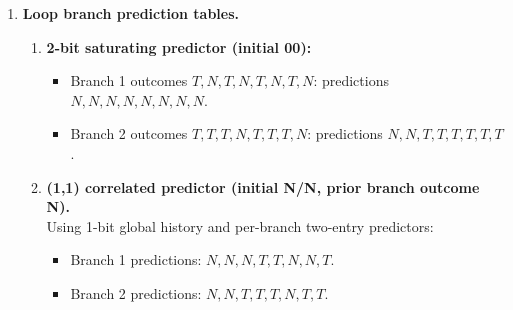 \documentclass[11pt]{article}
\begin{document}
\begin{enumerate}
\item \textbf{Loop branch prediction tables.}
\begin{enumerate}[label=(\alph*)]
\item \textbf{2-bit saturating predictor (initial 00):}
\begin{itemize}
\item Branch 1 outcomes $T,N,T,N,T,N,T,N$: predictions $\boxed{N,N,N,N,N,N,N,N}$.
\item Branch 2 outcomes $T,T,T,N,T,T,T,N$: predictions $\boxed{N,N,T,T,T,T,T,T}$.
\end{itemize}

\item \textbf{(1,1) correlated predictor (initial N/N, prior branch outcome N).}\\
Using 1-bit global history and per-branch two-entry predictors:
\begin{itemize}
\item Branch 1 predictions: $\boxed{N,N,N,T,T,N,N,T}$.
\item Branch 2 predictions: $\boxed{N,N,T,T,T,N,T,T}$.
\end{itemize}
\end{enumerate}
\end{enumerate}
\end{document}
